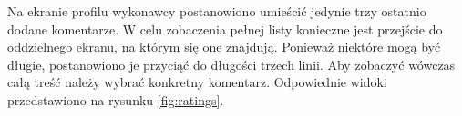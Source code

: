 Na ekranie profilu wykonawcy postanowiono umieścić jedynie trzy ostatnio dodane komentarze. W celu zobaczenia pełnej listy konieczne jest przejście do oddzielnego ekranu, na którym się one znajdują. Ponieważ niektóre mogą być długie, postanowiono je przyciąć do długości trzech linii. Aby zobaczyć wówczas całą treść należy wybrać konkretny komentarz. Odpowiednie widoki przedstawiono na rysunku \ref{fig:ratings}.

\begin{figure}[ht]
  \captionsetup[subfigure]{justification=centering}
  \centering
  \begin{subfigure}[t]{0.32\textwidth}
    \centering

\end{subfigure}
\end{figure}
